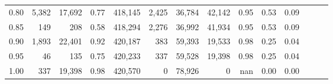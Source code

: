 \begin{tabular}{rrrrrrrrrrrrrr}
0.80 &   5,382 &  17,692 &  0.77 &  418,145 &    2,425 &  36,784 &  42,142 &  0.95 &  0.53 &      0.09 \\
0.85 &     149 &     208 &  0.58 &  418,294 &    2,276 &  36,992 &  41,934 &  0.95 &  0.53 &      0.09 \\
0.90 &   1,893 &  22,401 &  0.92 &  420,187 &      383 &  59,393 &  19,533 &  0.98 &  0.25 &      0.04 \\
0.95 &      46 &     135 &  0.75 &  420,233 &      337 &  59,528 &  19,398 &  0.98 &  0.25 &      0.04 \\
1.00 &     337 &  19,398 &  0.98 &  420,570 &        0 &  78,926 &       0 &   nan &  0.00 &      0.00 \\
\bottomrule
\end{tabular}
